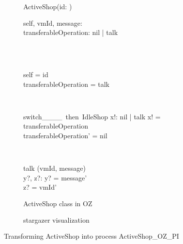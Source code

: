 \begin{figure}[H]
\begin{subfigure}{.6\textwidth}
\centering
\begin{class}{ActiveShop(id: \integer)}
\\
\begin{state}
self, vmId, message: \integer
\\transferableOperation: nil | talk
\end{state} 
\\
\begin{init}
\\self = id
\\transferableOperation = talk
\end{init} 
\\
\begin{op}{switch\_\_\_\_\ then\ IdleShop}
x!: nil | talk
\ST
x! = transferableOperation
\\transferableOperation' = nil
\end{op}
\\
\begin{op}{talk}
\Delta (vmId, message)
\\y?, z?: \integer
\ST
y? = message'
\\z? = vmId'
\end{op}
\end{class}
  \caption{ActiveShop class in OZ}
\end{subfigure}%
\begin{subfigure}{.4\textwidth}
  \centering
{}
  \caption{stargazer visualization}
\end{subfigure}
\caption{Transforming ActiveShop into \picalc{} process ActiveShop\_OZ\_PI}
\label{tra_activeShop_OZ}
\end{figure}

